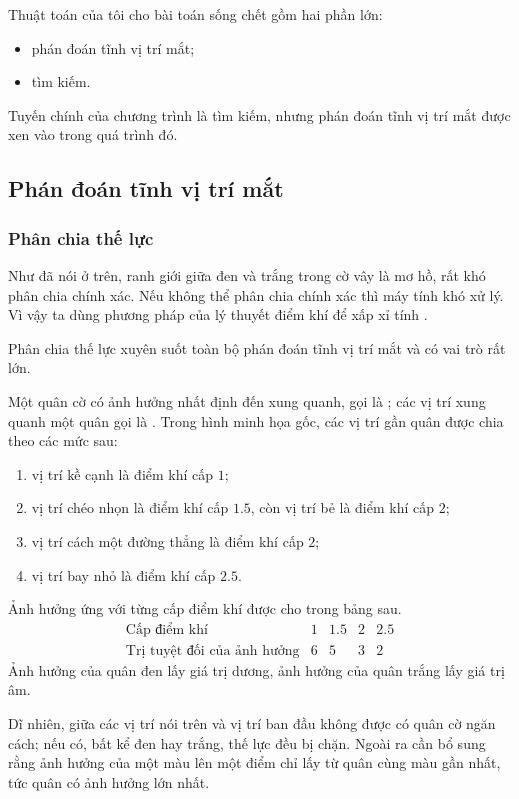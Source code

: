 \documentclass[11pt]{article}
\begin{document}
Thuật toán của tôi cho bài toán sống chết gồm hai phần lớn:
\begin{itemize}
  \item phán đoán tĩnh vị trí mắt;
  \item tìm kiếm.
\end{itemize}

Tuyến chính của chương trình là tìm kiếm, nhưng phán đoán tĩnh vị trí mắt
được xen vào trong quá trình đó.

\subsection{Phán đoán tĩnh vị trí mắt}

\subsubsection{Phân chia thế lực}

Như đã nói ở trên, ranh giới giữa đen và trắng trong cờ vây là mơ hồ, rất
khó phân chia chính xác. Nếu không thể phân chia chính xác thì máy tính khó
xử lý. Vì vậy ta dùng phương pháp của lý thuyết điểm khí để xấp xỉ tính
.

Phân chia thế lực xuyên suốt toàn bộ phán đoán tĩnh vị trí mắt và có vai trò
rất lớn.

Một quân cờ có ảnh hưởng nhất định đến xung quanh, gọi là ;
các vị trí xung quanh một quân gọi là . Trong hình minh họa
gốc, các vị trí gần quân được chia theo các mức sau:
\begin{enumerate}
  \item vị trí kề cạnh là điểm khí cấp \(1\);
  \item vị trí chéo nhọn là điểm khí cấp \(1.5\), còn vị trí bẻ là điểm khí
  cấp \(2\);
  \item vị trí cách một đường thẳng là điểm khí cấp \(2\);
  \item vị trí bay nhỏ là điểm khí cấp \(2.5\).
\end{enumerate}

Ảnh hưởng ứng với từng cấp điểm khí được cho trong bảng sau.
\[
\begin{array}{c|cccc}
\text{Cấp điểm khí} & 1 & 1.5 & 2 & 2.5\\
\hline
\text{Trị tuyệt đối của ảnh hưởng} & 6 & 5 & 3 & 2
\end{array}
\]
Ảnh hưởng của quân đen lấy giá trị dương, ảnh hưởng của quân trắng lấy giá
trị âm.

Dĩ nhiên, giữa các vị trí nói trên và vị trí ban đầu không được có quân cờ
ngăn cách; nếu có, bất kể đen hay trắng, thế lực đều bị chặn. Ngoài ra cần bổ
sung rằng ảnh hưởng của một màu lên một điểm chỉ lấy từ quân cùng màu gần
nhất, tức quân có ảnh hưởng lớn nhất.
\end{document}
